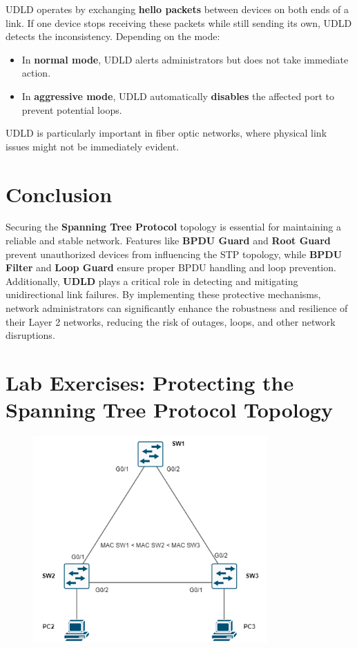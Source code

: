 \documentclass[a4paper]{book}
\begin{document}
UDLD operates by exchanging \textbf{hello packets} between devices on both ends of a link. If one device stops receiving these packets while still sending its own, UDLD detects the inconsistency. Depending on the mode:
\begin{itemize}
    \item In \textbf{normal mode}, UDLD alerts administrators but does not take immediate action.
    \item In \textbf{aggressive mode}, UDLD automatically \textbf{disables} the affected port to prevent potential loops.
\end{itemize}

UDLD is particularly important in fiber optic networks, where physical link issues might not be immediately evident.

\section*{Conclusion}

Securing the \textbf{Spanning Tree Protocol} topology is essential for maintaining a reliable and stable network. Features like \textbf{BPDU Guard} and \textbf{Root Guard} prevent unauthorized devices from influencing the STP topology, while \textbf{BPDU Filter} and \textbf{Loop Guard} ensure proper BPDU handling and loop prevention. Additionally, \textbf{UDLD} plays a critical role in detecting and mitigating unidirectional link failures. By implementing these protective mechanisms, network administrators can significantly enhance the robustness and resilience of their Layer 2 networks, reducing the risk of outages, loops, and other network disruptions.


\newpage
\section*{Lab Exercises: Protecting the Spanning Tree Protocol Topology}

\begin{figure}[h]
    \centering
    \includegraphics[width=0.8\textwidth]{img/STPConvergence01.png}
    \caption{\textit{}}
\end{figure}
\end{document}
